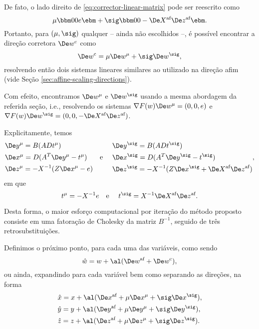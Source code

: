 De fato, o lado direito de  \eqref{eq:corrector-linear-matrix} pode ser
reescrito como
\begin{equation}
\label{eq:corrector-linear-matrix-rhs}
\mu\bbm 0 \\  0 \\ e
\ebm + \sig \bbm 0  \\ 0 \\ - \deX\dez
\ebm.
\end{equation}
Portanto, para $(\mu,\sig)$ qualquer -- ainda não escolhidos --, é possível
encontrar a direção corretora $\Decow$ como
\begin{equation}
\label{eq:Corrector-spllited}
\Decow = \mu \Dew^{\mu} + \sig
\Dew^{\sig},
\end{equation} 
resolvendo então dois sistemas lineares similares ao utilizado na direção afim (vide  Seção 
\ref{sec:affine-scaling-directions}). 

Com efeito, encontramos 
$\Dew^\mu$ e $\Dew^\sig$  usando a
mesma abordagem da referida seção, i.e., resolvendo
os sistemas $\nabla F(w)\Dew^\mu = (0,0,e)$ e $\nabla F(w)\Dew^\sig = (0,0,-
\deX\dez)$.


Explicitamente, temos
\begin{equation}
\label{eq:De_C} 
\begin{aligned}
& \Dey^{\mu} = B(ADt^\mu )\\
& \Dex^{\mu} = D(A^T\Dey^{\mu} - t^\mu) \\
& \Dez^{\mu} = -X^{-1}(Z\Dex^{\mu} - e)
\end{aligned} \text{\quad e \quad } \begin{aligned}
& \Dey^{\sig} = B(ADt^\sig)\\
& \Dex^{\sig} = D(A^T\Dey^{\sig} - t^\sig) \\
& \Dez^{\sig} = -X^{-1}(Z\Dex^{\sig} + \deX\dez)
\end{aligned}, 
\end{equation}
em que
\[
t^\mu = - X^{-1}e \text{\quad e \quad} t^\sig = X^{-1}\deX\dez.
\]

Desta forma, o maior esforço computacional por iteração do método proposto consiste
em uma fatoração de Cholesky da matriz $B^{-1}$, seguido de três retrosubstituições.
 
 
Definimos o próximo ponto, para cada uma das variáveis, como sendo \[\hat{w} = w
+ \al(\dew + \Decow),\] 
ou ainda, expandindo para cada variável bem como
separando as direções, na forma
\begin{subequations}
\label{eq:next-iterate}
\begin{align}
& \hat{x} = x + \al(\dex + \mu\Dex^\mu + \sig\Dex^\sig ),  \\
& \hat{y} = y + \al(\dey + \mu\Dey^\mu + \sig\Dey^\sig ), \\
& \hat{z} = z + \al(\dez + \mu\Dez^\mu + \sig\Dez^\sig ).
\end{align} 
\end{subequations}

